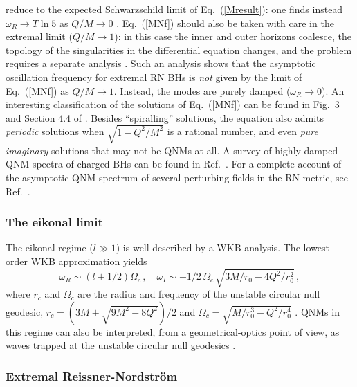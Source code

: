 \documentclass[]{iopart}
\def\be{\begin{equation}}
\def\ee{\end{equation}}
\begin{document}
reduce to the expected Schwarzschild limit of Eq.~(\ref{Mresult}): one finds
instead $\omega_R \rightarrow T \ln 5$ as $Q/M\to 0$
\cite{Motl:2003cd,Neitzke:2003mz}.  Eq.~(\ref{MNf}) should also be taken with
care in the extremal limit ($Q/M\to 1$): in this case the inner and outer
horizons coalesce, the topology of the singularities in the differential
equation changes, and the problem requires a separate analysis
\cite{Natario:2004jd}. Such an analysis shows that the asymptotic oscillation
frequency for extremal RN BHs is {\it not} given by the limit of
Eq.~(\ref{MNf}) as $Q/M\to 1$. Instead, the modes are purely damped
($\omega_R\to 0$).
%
An interesting classification of the solutions of Eq.~(\ref{MNf}) can be found
in Fig.~3 and Section 4.4 of \cite{Andersson:2003fh}. Besides ``spiralling''
solutions, the equation also admits {\it periodic} solutions when
$\sqrt{1-Q^2/M^2}$ is a rational number, and even {\it pure imaginary}
solutions that may not be QNMs at all. A survey of highly-damped QNM spectra
of charged BHs can be found in Ref.~\cite{Natario:2004jd}. For a complete
account of the asymptotic QNM spectrum of several perturbing fields in the RN
metric, see Ref.~\cite{Cho:2005yc}.

\subsubsection*{The eikonal limit}

The eikonal regime ($l\gg 1$) is well described by a WKB analysis.  The
lowest-order WKB approximation yields 
%
\be
\omega_R\sim\left (l+1/2\right )\Omega_c\,,\quad \omega_I\sim -1/2\,\Omega_c\,\sqrt{3M/r_0-4Q^2/r_0^2}\,,
\ee
%
where $r_c$ and $\Omega_c$ are the radius and frequency of the unstable
circular null geodesic, $r_c=\left (3M+\sqrt{9M^2-8Q^2}\right )/2$ and
$\Omega_c=\sqrt{M/r_0^3-Q^2/r_0^4}$
\cite{Kokkotas:1988fm,Andersson:1996xw}. QNMs in this regime can also be
interpreted, from a geometrical-optics point of view, as waves trapped at the
unstable circular null geodesics \cite{mashhoon,Cardoso:2008bp}.

\subsubsection*{\label{sec:rnse}Extremal Reissner-Nordstr\"om}
\end{document}

